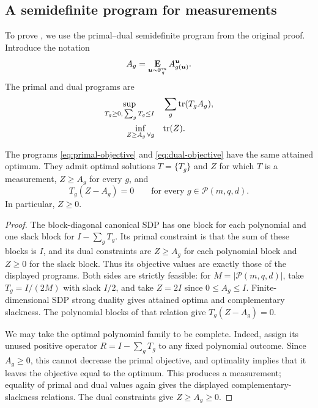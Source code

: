 \documentclass[11pt]{article}
\theoremstyle{definition}
\newcommand{\E}{\mathop{\bf E\/}}
\newcommand{\F}{\mathbb F}
\newcommand{\calP}{\mathcal{P}}
\newcommand{\bu}{\boldsymbol{u}}
\newcommand{\polyfunc}[3]{\calP(#1, #2, #3)}
\begin{document}
\subsection{A semidefinite program for measurements}

To prove , we use the primal--dual
semidefinite program from the original proof.  Introduce the notation
\begin{equation*}
A_g = \E_{\bu \sim \F_q^m} A^{\bu}_{g(\bu)}.
\end{equation*}
The primal and dual programs are
\begin{align}
 \sup_{T_g\geq0,\,\sum_gT_g\leq I}
   &\quad\sum_g\mathrm{tr}(T_gA_g),\label{eq:primal-objective}\\
 \inf_{Z\geq A_g\,\forall g}
   &\quad\mathrm{tr}(Z).\label{eq:dual-objective}
\end{align}

\begin{lemma}\label{lem:sdp}
The programs \eqref{eq:primal-objective} and
\eqref{eq:dual-objective} have the same attained optimum.  They admit
optimal solutions $T=\{T_g\}$ and $Z$ for which $T$ is a measurement,
$Z\geq A_g$ for every $g$, and
\begin{equation}\label{eq:complementary-slackness}
 T_g(Z-A_g)=0\qquad\text{for every }g\in\polyfunc{m}{q}{d}.
\end{equation}
In particular, $Z\geq0$.
\end{lemma}

\begin{proof}
The block-diagonal canonical SDP has one block for each polynomial and
one slack block for $I-\sum_gT_g$.  Its primal constraint is that the
sum of these blocks is $I$, and its dual constraints are $Z\geq A_g$
for each polynomial block and $Z\geq0$ for the slack block.  Thus its
objective values are exactly those of the displayed programs.
Both sides are strictly feasible: for $M=|\polyfunc{m}{q}{d}|$, take
$T_g=I/(2M)$ with slack $I/2$, and take $Z=2I$ since $0\leq A_g\leq I$.
Finite-dimensional SDP strong duality gives attained optima and
complementary slackness.  The polynomial blocks of that relation give
$T_g(Z-A_g)=0$.

We may take the optimal polynomial family to be complete.  Indeed,
assign its unused positive operator $R=I-\sum_gT_g$ to any fixed
polynomial outcome.  Since $A_g\geq0$, this cannot decrease the primal
objective, and optimality implies that it leaves the objective equal
to the optimum.  This produces a measurement; equality of primal and
dual values again gives the displayed complementary-slackness
relations.  The dual constraints give $Z\geq A_g\geq0$.
\end{proof}
\end{document}
